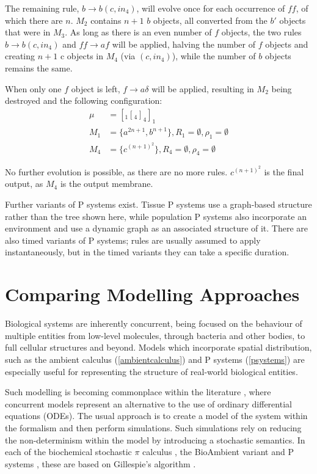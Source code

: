 The remaining rule, $b \rightarrow b(c, in_4)$, will evolve once for
each occurrence of $ff$, of which there are $n$.  $M_2$ contains $n + 1$
$b$ objects, all converted from the $b'$ objects that were in $M_3$.  As
long as there is an even number of $f$ objects, the two rules $b
\rightarrow b(c, in_4)$ and $ff \rightarrow af$ will be applied, halving
the number of $f$ objects and creating $n + 1$ c objects in $M_4$ (via
$(c, in_4)$), while the number of $b$ objects remains the same.

When only one $f$ object is left, $f \rightarrow a\delta$ will be
applied, resulting in $M_2$ being destroyed and the following
configuration:
\begin{align*}
\mu & = [_1[_4]_4]_1 \\
M_1 & = \{a^{2n+1},b^{n+1}\}, 
R_1 = \emptyset,
\rho_1 = \emptyset \\
M_4 & = \{c^{(n+1)^2}\},
R_4 = \emptyset,
\rho_4 = \emptyset
\end{align*}

\noindent No further evolution is possible, as there are no more rules.
$c^{(n+1)^2}$ is the final output, as $M_4$ is the output membrane.

Further variants of P systems exist.  Tissue P systems use a
graph-based structure rather than the tree shown here, while
population P systems also incorporate an environment and use a dynamic
graph as an associated structure of it.  There are also timed variants
of P systems; rules are usually assumed to apply instantaneously, but
in the timed variants they can take a specific duration.

\section{Comparing Modelling Approaches}
\label{bioapps}

Biological systems are inherently concurrent, being focused on the
behaviour of multiple entities from low-level molecules, through
bacteria and other bodies, to full cellular structures and beyond.
Models which incorporate spatial distribution, such as the ambient
calculus (\ref{ambientcalculus}) and P systems (\ref{psystems}) are
especially useful for representing the structure of real-world
biological entities.

Such modelling is becoming commonplace within the literature
 \cite{fran,cardelli:bioambients,biospi}, where concurrent models
represent an alternative to the use of ordinary differential equations
(ODEs).  The usual approach is to create a model of the system within
the formalism and then perform simulations.  Such simulations rely on
reducing the non-determinism within the model by introducing a
stochastic semantics.  In each of the biochemical stochastic $\pi$
calculus \cite{biospi}, the BioAmbient variant
\cite{cardelli:bioambients} and P systems \cite{fran}, these are based
on Gillespie's algorithm \cite{gillespie}.

